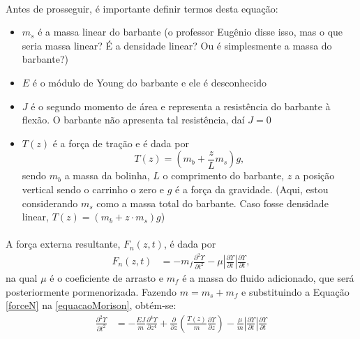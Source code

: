\documentclass[a4paper,11pt]{scrartcl} %
\numberwithin{equation}{section} %
\numberwithin{figure}{section} %
\numberwithin{table}{section} %
\begin{document}
\paragraph{} Antes de prosseguir, é importante definir termos desta equação: \begin{itemize}
	\item $m_s$ é a massa linear do barbante (o professor Eugênio disse isso, mas o que seria massa linear? É a densidade linear? Ou é simplesmente a massa do barbante?) %
	\item $E$ é o módulo de Young do barbante e ele é desconhecido
	\item $J$ é o segundo momento de área e representa a resistência do barbante à flexão. O barbante não apresenta tal resistência, daí $J=0$
	\item $T(z)$ é a força de tração e é dada por \[T(z) = \left(m_b+\frac{z}{L}m_s\right)g,\] sendo $m_b$ a massa da bolinha, $L$ o comprimento do barbante, $z$ a posição vertical sendo o carrinho o zero e $g$ é a força da gravidade. (Aqui, estou considerando $m_s$ como a massa total do barbante. Caso fosse densidade linear, $T(z) = (m_b + z\cdot m_s) g$)
\end{itemize}

\paragraph{} A força externa resultante, $F_n(z,t)$, é dada por \begin{align}
	F_n(z,t) &= -m_f \frac{\partial^2 \Upsilon}{\partial t^2} - \mu \left|\frac{\partial \Upsilon}{\partial t}\right|\frac{\partial \Upsilon}{\partial t}\label{forceN},
\end{align} na qual $\mu$ é o coeficiente de arrasto e $m_f$ é a massa do fluido adicionado, que será posteriormente pormenorizada. Fazendo $m = m_s + m_f$ e substituindo a Equação \ref{forceN} na \ref{equacaoMorison}, obtém-se: \begin{align}
	\frac{\partial^2 \Upsilon}{\partial t^2} &= -\frac{EJ}{m}\frac{\partial^4 \Upsilon}{\partial z^4} + \frac{\partial}{\partial z}\left(\frac{T(z)}{m}\frac{\partial \Upsilon}{\partial z}\right) - \frac{\mu}{m}\left|\frac{\partial \Upsilon}{\partial t}\right|\frac{\partial \Upsilon}{\partial t}
\end{align}
\end{document}
